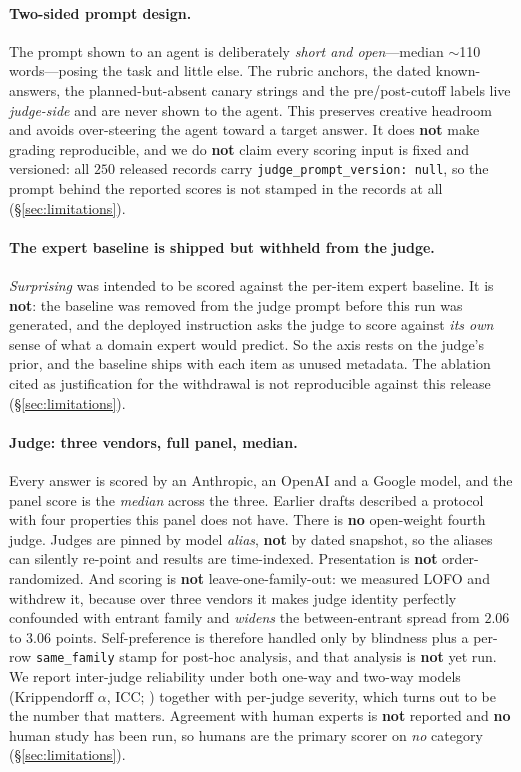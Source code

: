 \paragraph{Two-sided prompt design.} The prompt shown to an agent is deliberately \emph{short and
open}---median $\sim$110 words---posing the task and little else. The rubric anchors, the dated
known-answers, the planned-but-absent canary strings and the pre/post-cutoff labels live
\emph{judge-side} and are never shown to the agent. This preserves creative headroom and avoids
over-steering the agent toward a target answer. It does \textbf{not} make grading reproducible, and we
do \textbf{not} claim every scoring input is fixed and versioned: all $250$ released records carry
\texttt{judge\_prompt\_version: null}, so the prompt behind the reported scores is not stamped in the
records at all (\S\ref{sec:limitations}).

\paragraph{The expert baseline is shipped but withheld from the judge.} \emph{Surprising} was intended
to be scored against the per-item expert baseline. It is \textbf{not}: the baseline was removed from
the judge prompt before this run was generated, and the deployed instruction asks the judge to score
against \emph{its own} sense of what a domain expert would predict. So the axis rests on the judge's
prior, and the baseline ships with each item as unused metadata. The ablation cited as justification
for the withdrawal is not reproducible against this release (\S\ref{sec:limitations}).

\paragraph{Judge: three vendors, full panel, median.} Every answer is scored by an Anthropic, an
OpenAI and a Google model, and the panel score is the \emph{median} across the three. Earlier drafts
described a protocol with four properties this panel does not have. There is \textbf{no} open-weight
fourth judge. Judges are pinned by model \emph{alias}, \textbf{not} by dated snapshot, so the aliases
can silently re-point and results are time-indexed. Presentation is \textbf{not} order-randomized.
And scoring is \textbf{not} leave-one-family-out: we measured LOFO and withdrew it, because over
three vendors it makes judge identity perfectly confounded with entrant family and \emph{widens} the
between-entrant spread from $2.06$ to $3.06$ points. Self-preference is therefore handled only by
blindness plus a per-row \texttt{same\_family} stamp for post-hoc analysis, and that analysis is
\textbf{not} yet run. We report inter-judge reliability under both one-way and two-way models
(Krippendorff $\alpha$, ICC; \citealp{hayes2007alpha,koo2016icc}) together with per-judge severity,
which turns out to be the number that matters. Agreement with human experts is \textbf{not} reported
and \textbf{no} human study has been run, so humans are the primary scorer on \emph{no} category
(\S\ref{sec:limitations}).

